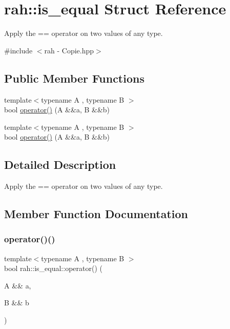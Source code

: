 \hypertarget{structrah_1_1is__equal}{}\section{rah\+::is\+\_\+equal Struct Reference}
\label{structrah_1_1is__equal}


Apply the \textquotesingle{}==\textquotesingle{} operator on two values of any type.  




{\ttfamily \#include $<$rah -\/ Copie.\+hpp$>$}

\subsection*{Public Member Functions}
\begin{DoxyCompactItemize}
\item 
{\footnotesize template$<$typename A , typename B $>$ }\\bool \mbox{\hyperlink{structrah_1_1is__equal_a0b24ed08028993dd652bcdc7c1414745}{operator()}} (A \&\&a, B \&\&b)
\item 
{\footnotesize template$<$typename A , typename B $>$ }\\bool \mbox{\hyperlink{structrah_1_1is__equal_a0b24ed08028993dd652bcdc7c1414745}{operator()}} (A \&\&a, B \&\&b)
\end{DoxyCompactItemize}


\subsection{Detailed Description}
Apply the \textquotesingle{}==\textquotesingle{} operator on two values of any type. 

\subsection{Member Function Documentation}
\mbox{\label{structrah_1_1is__equal_a0b24ed08028993dd652bcdc7c1414745}} 
\subsubsection{\texorpdfstring{operator()()}{operator()()}\hspace{0.1cm}{\footnotesize\ttfamily [1/2]}}
{\footnotesize\ttfamily template$<$typename A , typename B $>$ \\
bool rah\+::is\+\_\+equal\+::operator() (\begin{DoxyParamCaption}\item[{A \&\&}]{a,  }\item[{B \&\&}]{b }\end{DoxyParamCaption})\hspace{0.3cm}{\ttfamily [inline]}}

